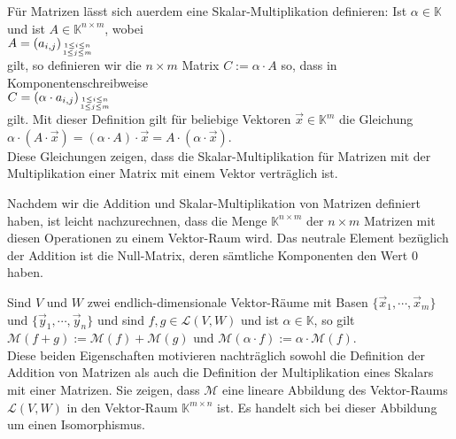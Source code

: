 F\"{u}r Matrizen l\"{a}sst sich au\3erdem eine Skalar-Multiplikation definieren:  Ist $\alpha \in \mathbb{K}$
und ist $A \in \mathbb{K}^{n \times m}$, wobei
\\[0.2cm]
\hspace*{1.3cm}
$A = (a_{i,j})_{1\leq i \leq n \atop 1 \leq j \leq m}$
\\[0.2cm]
gilt, so definieren wir die $n \times m$ Matrix 
$C := \alpha \cdot A$ so, dass in Komponentenschreibweise
\\[0.2cm]
\hspace*{1.3cm}
$C = (\alpha \cdot a_{i,j})_{1\leq i \leq n \atop 1 \leq j \leq m}$ 
\\[0.2cm]
gilt.  Mit
dieser Definition gilt f\"{u}r beliebige Vektoren $\vec{x} \in \mathbb{K}^m$ die Gleichung
\\[0.2cm]
\hspace*{1.3cm}
$\alpha \cdot (A \cdot \vec{x}) = (\alpha \cdot A) \cdot \vec{x} = A \cdot (\alpha \cdot \vec{x})$.
\\[0.2cm]
Diese Gleichungen zeigen, dass die Skalar-Multiplikation f\"{u}r Matrizen mit der Multiplikation einer
Matrix mit einem Vektor vertr\"{a}glich ist.

\remark
Nachdem wir die Addition und Skalar-Multiplikation von Matrizen definiert haben, ist leicht
nachzurechnen, dass die Menge $\mathbb{K}^{n \times m}$ der $n \times m$ Matrizen mit diesen
Operationen zu einem Vektor-Raum wird.  Das neutrale Element bez\"{u}glich der Addition ist die
Null-Matrix, deren s\"{a}mtliche Komponenten den Wert $0$ haben.

\remark
Sind $V$ und $W$ zwei endlich-dimensionale Vektor-R\"{a}ume mit Basen
$\{\vec{x}_1, \cdots, \vec{x}_m\}$ und $\{\vec{y}_1, \cdots, \vec{y}_n\}$ und sind $f, g \in \mathcal{L}(V, W)$ und ist $\alpha \in \mathbb{K}$, so gilt
\\[0.2cm]
\hspace*{1.3cm}
$\mathcal{M}(f+g) := \mathcal{M}(f) + \mathcal{M}(g)$ \quad und \quad
$\mathcal{M}(\alpha \cdot f) := \alpha \cdot \mathcal{M}(f)$.
\\[0.2cm]
Diese beiden Eigenschaften motivieren nachtr\"{a}glich sowohl die Definition der Addition von Matrizen
als auch die Definition der Multiplikation eines Skalars mit einer Matrizen.  
Sie zeigen, dass $\mathcal{M}$ eine lineare Abbildung des Vektor-Raums $\mathcal{L}(V,W)$ in den Vektor-Raum $\mathbb{K}^{m \times n}$ ist.  
Es handelt sich bei dieser Abbildung um einen Isomorphismus.
\eoxs



